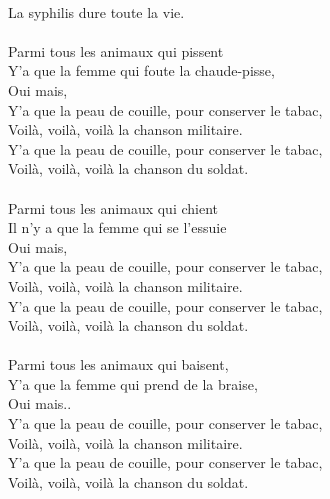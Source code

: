 \\La syphilis dure toute la vie.
\\\\Parmi tous les animaux qui pissent
\\Y'a que la femme qui foute la chaude-pisse,
\\Oui mais, 
\\Y'a que la peau de couille, pour conserver le tabac,
\\Voilà, voilà, voilà la chanson militaire.
\\Y'a que la peau de couille, pour conserver le tabac,
\\Voilà, voilà, voilà la chanson du soldat.
\\\\Parmi tous les animaux qui chient
\\Il n'y a que la femme qui se l'essuie
\\Oui mais,
\\Y'a que la peau de couille, pour conserver le tabac,
\\Voilà, voilà, voilà la chanson militaire.
\\Y'a que la peau de couille, pour conserver le tabac,
\\Voilà, voilà, voilà la chanson du soldat.
\\\\Parmi tous les animaux qui baisent,
\\Y'a que la femme qui prend de la braise,
\\Oui mais..
\\Y'a que la peau de couille, pour conserver le tabac,
\\Voilà, voilà, voilà la chanson militaire.
\\Y'a que la peau de couille, pour conserver le tabac,
\\Voilà, voilà, voilà la chanson du soldat.

\breakpage